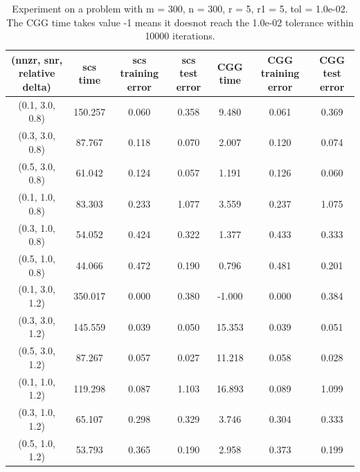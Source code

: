 \documentclass[english]{article}
\begin{document}
\begin{table}[H] 
	\centering
	\label{MC-side-information}
	\begin{tabular}{ccccccc}
		\toprule
		(nnzr, snr, relative delta) &scs time &scs training error &scs test error &CGG time &CGG training error &CGG test error\\ 
		\midrule 
		(0.1, 3.0, 0.8)& 150.257  &0.060  &0.358  &9.480  &0.061  &0.369 \\ 
		(0.3, 3.0, 0.8)& 87.767  &0.118  &0.070  &2.007  &0.120  &0.074 \\ 
		(0.5, 3.0, 0.8)& 61.042  &0.124  &0.057  &1.191  &0.126  &0.060 \\ 
		(0.1, 1.0, 0.8)& 83.303  &0.233  &1.077  &3.559  &0.237  &1.075 \\ 
		(0.3, 1.0, 0.8)& 54.052  &0.424  &0.322  &1.377  &0.433  &0.333 \\ 
		(0.5, 1.0, 0.8)& 44.066  &0.472  &0.190  &0.796  &0.481  &0.201 \\ 
		(0.1, 3.0, 1.2)& 350.017  &0.000  &0.380  &-1.000  &0.000  &0.384 \\ 
		(0.3, 3.0, 1.2)& 145.559  &0.039  &0.050  &15.353  &0.039  &0.051 \\ 
		(0.5, 3.0, 1.2)& 87.267  &0.057  &0.027  &11.218  &0.058  &0.028 \\ 
		(0.1, 1.0, 1.2)& 119.298  &0.087  &1.103  &16.893  &0.089  &1.099 \\ 
		(0.3, 1.0, 1.2)& 65.107  &0.298  &0.329  &3.746  &0.304  &0.333 \\ 
		(0.5, 1.0, 1.2)& 53.793  &0.365  &0.190  &2.958  &0.373  &0.199 \\ 
		\bottomrule
	\end{tabular}
	\caption{Experiment on a problem with m = 300, n = 300, r = 5, r1 = 5, tol = 1.0e-02. The CGG time takes value -1 means it doesnot reach the 1.0e-02 tolerance within 10000 iterations.}
\end{table}
\end{document}
